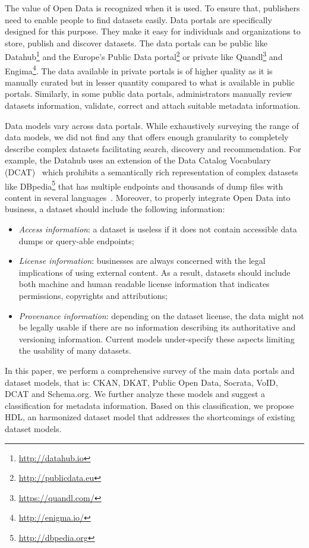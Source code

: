The value of Open Data is recognized when it is used. To ensure that, publishers need to enable people to find datasets easily. Data portals are specifically designed for this purpose. They make it easy for individuals and organizations to store, publish and discover datasets. The data portals can be public like Datahub\footnote{\url{http://datahub.io}} and the Europe's Public Data portal\footnote{\url{http://publicdata.eu}} or private like Quandl\footnote{\url{https://quandl.com/}} and Engima\footnote{\url{http://enigma.io/}}. The data available in private portals is of higher quality as it is manually curated but in lesser quantity compared to what is available in public portals. Similarly, in some public data portals, administrators manually review datasets information, validate, correct and attach suitable metadata information.

Data models vary across data portals. While exhaustively surveying the range of data models, we did not find any that offers enough granularity to completely describe complex datasets facilitating search, discovery and recommendation. For example, the Datahub uses an extension of the Data Catalog Vocabulary (DCAT)~\cite{Erickson:DCV:14} which prohibits a semantically rich representation of complex datasets like DBpedia\footnote{\url{http://dbpedia.org}} that has multiple endpoints and thousands of dump files with content in several languages~\cite{Brummer::ICSS:14}. Moreover, to properly integrate Open Data into business, a dataset should include the following information:
\begin{itemize}
 \item \emph{Access information}: a dataset is useless if it does not contain accessible data dumps or query-able endpoints;
 \item \emph{License information}: businesses are always concerned with the legal implications of using external content. As a result, datasets should include both machine and human readable license information that indicates permissions, copyrights and attributions;
 \item \emph{Provenance information}: depending on the dataset license, the data might not be legally usable if there are no information describing its authoritative and versioning information. Current models under-specify these aspects limiting the usability of many datasets.
 \end{itemize}

In this paper, we perform a comprehensive survey of the main data portals and dataset models, that is: CKAN, DKAT, Public Open Data, Socrata, VoID, DCAT and Schema.org. We further analyze these models and suggest a classification for metadata information. Based on this classification, we propose HDL, an harmonized dataset model that addresses the shortcomings of existing dataset models.

